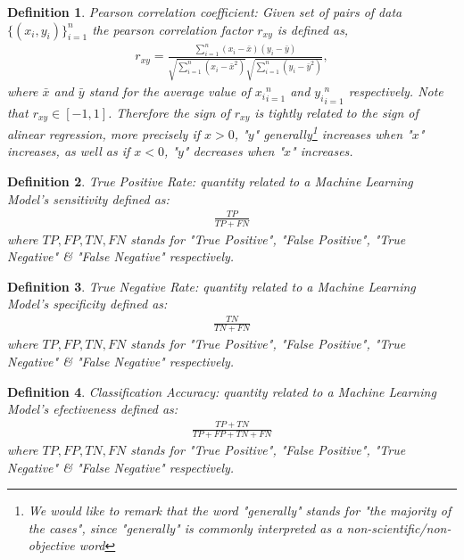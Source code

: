 \documentclass[11pt]{article}
\newtheorem{definition}{Definition}
\begin{document}
\begin{definition}\label{definitionPersonCoefficient}
Pearson correlation coefficient: Given set of pairs of data $\{(x_i,y_i)\}_{i=1}^n$ the pearson correlation factor $r_{xy}$ is defined as,
\begin{align}
r_{xy}=\frac{\sum_{i=1}^n(x_i-\bar{x})(y_i-\bar{y})}{\sqrt{\sum_{i=1}^n(x_i-\bar{x}^2)}\sqrt{\sum_{i=1}^n(y_i-\bar{y}^2)}},
\end{align}
where $\bar{x}$ and $\bar{y}$ stand for the average value of ${x_i}_{i=1}^n$ and ${y_i}_{i=1}^n$ respectively. Note that $r_{xy}\in[-1,1]$. Therefore the sign of $r_{xy}$ is tightly related to the sign of alinear regression, more precisely if $x>0$, "$y$" generally\footnote{We would like to remark that the word "generally" stands for "the majority of the cases", since "generally" is commonly interpreted as a non-scientific/non-objective word} increases when "$x$" increases, as well as if $x<0$, "$y$" decreases when "$x$" increases.
\end{definition}
\begin{definition}\label{definitionTruePositiveRate}
True Positive Rate: quantity related to a Machine Learning Model's sensitivity defined as:
\begin{align}
\frac{TP}{TP+FN}
\end{align}
where $TP,FP,TN,FN$ stands for "True Positive", "False Positive", "True Negative" \& "False Negative" respectively.
\end{definition}

\begin{definition}\label{definitionTrueNegativeRate}
True Negative Rate: quantity related to a Machine Learning Model's specificity defined as:
\begin{align}
\frac{TN}{TN+FN}
\end{align}
where $TP,FP,TN,FN$ stands for "True Positive", "False Positive", "True Negative" \& "False Negative" respectively.
\end{definition}

\begin{definition}\label{definitionClassificationAccuracy}
Classification Accuracy: quantity related to a Machine Learning Model's efectiveness defined as:
\begin{align}
\frac{TP+TN}{TP+FP+TN+FN}
\end{align}
where $TP,FP,TN,FN$ stands for "True Positive", "False Positive", "True Negative" \& "False Negative" respectively.
\end{definition}
\end{document}
